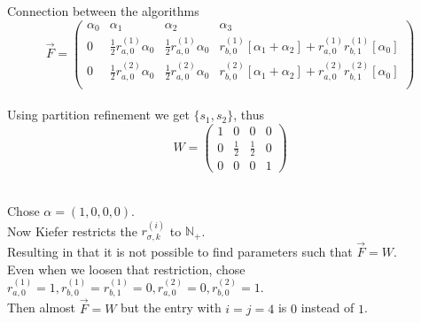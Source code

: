 \documentclass[rgb, pdf]{beamer}
\begin{document}
\begin{frame}[allowframebreaks]{Connection between the algorithms}
         \[ \overrightarrow{F} = \begin{pmatrix}
                                    \alpha_0 & \alpha_1 & \alpha_2 & \alpha_3 \\
                                    0 & \frac{1}{2} r^{(1)}_{a,0} \alpha_0 & \frac{1}{2} r^{(1)}_{a,0} \alpha_0 & r^{(1)}_{b,0} [\alpha_1 + \alpha_2] + r^{(1)}_{a,0} r^{(1)}_{b,1} [\alpha_0]   \\
                                    0 & \frac{1}{2} r^{(2)}_{a,0} \alpha_0 & \frac{1}{2} r^{(2)}_{a,0} \alpha_0 & r^{(2)}_{b,0} [\alpha_1 + \alpha_2] + r^{(2)}_{a,0} r^{(2)}_{b,1} [\alpha_0]   \\
                                \end{pmatrix}
        \] \\ \vspace{0.6cm}
        Using partition refinement we get $\{s_1, s_2\}$, thus \[ W = \begin{pmatrix}
                                    1 & 0 & 0 & 0 \\
                                    0 & \frac{1}{2} & \frac{1}{2} & 0 \\
                                    0 & 0 & 0 & 1
                                \end{pmatrix} \]\\
                                \framebreak
                                
        Chose $\alpha = (1,0,0,0)$. \\
        Now Kiefer restricts the $r^{(i)}_{\sigma,k}$ to $\mathbb{N_+}$. \\
        Resulting in that it is not possible to find parameters such that $\overrightarrow{F} = W$. \\
        Even when we loosen that restriction, chose $r^{(1)}_{a,0} = 1, r^{(1)}_{b,0} = r^{(1)}_{b,1} = 0, r^{(2)}_{a,0} = 0, r^{(2)}_{b,0} = 1$.\\
        Then almost $\overrightarrow{F} = W$ but the entry with $i=j=4$ is $0$ instead of $1$. \\
        \end{frame}
        
\end{document}

